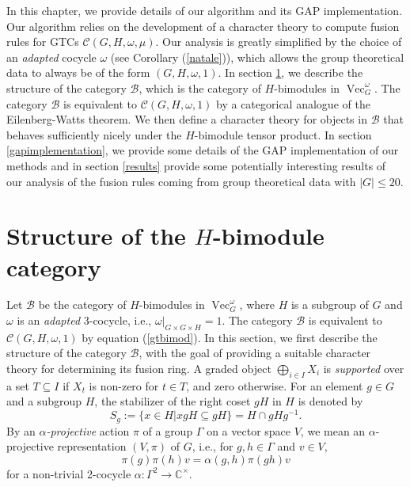 \documentclass[a4paper, 10pt]{book}
\theoremstyle{definition}
\numberwithin{equation}{chapter}
\newcommand\inv{^{-1}}
\newcommand\Vect{\operatorname{Vec}}
\newcommand\CC{\mathbb C}
\newcommand\C{\mathcal C}
\newcommand\B{\mathcal B}
\newcommand{\ra}\rightarrow
\begin{document}
In this chapter, we provide details of our algorithm and its GAP implementation. Our algorithm relies on the development of a character theory to compute fusion rules for GTCs $\C(G, H, \omega, \mu)$. Our analysis is greatly simplified by the choice of an \textit{adapted} cocycle  $\omega$ (see Corollary (\ref{natale})), which allows the group theoretical data to always be of the form $(G, H, \omega, 1)$.  In section \ref{structureHbimod}, we describe the structure of the category $\B$, which is the category of $H$-bimodules in $\Vect^\omega_G$. The category $\B$ is equivalent to $\C(G, H, \omega, 1)$ by a categorical analogue of the Eilenberg-Watts theorem. We then define a character theory for objects in $\B$ that behaves sufficiently nicely under the $H$-bimodule tensor product.  In section \ref{gapimplementation}, we provide some details of the GAP implementation of our methods and in section \ref{results} provide some potentially interesting results of our analysis of the fusion rules coming from group theoretical data with $|G|\leq 20$. 
\section{Structure of the $H$-bimodule category}\label{structureHbimod}
Let $\B $ be the category of $H$-bimodules in $\Vect^\omega_G$, where $H$ is a subgroup of $G$ and $\omega$ is an \textit{adapted} 3-cocycle, i.e., $\omega|_{G\times G\times H} = 1$. The category $\B$ is equivalent to $\C(G, H, \omega, 1)$ by equation (\ref{gtbimod}). In this section, we first describe the structure of the category $\B$, with the goal of providing a suitable character theory for determining its fusion ring. A graded object $\bigoplus_{i\in I} X_i$ is \textit{supported} over a set $T\subseteq I$ if $X_t$ is non-zero for $t\in T$, and zero otherwise. For an element $g\in G$ and a subgroup $H$, the stabilizer of the right coset $gH$ in $H$ is denoted by \begin{equation*}
	S_g := \{x\in H | xgH \subseteq gH\} = H\cap gHg\inv.
\end{equation*}
By an \textit{$\alpha$-projective} action $\pi$ of a group $\Gamma$ on a vector space $V$, we mean an $\alpha$-projective representation $(V, \pi)$ of $G$, i.e., for $g, h\in \Gamma$ and $v \in V$, \begin{equation*}
	\pi(g)\pi(h)v = \alpha(g, h)\pi(gh)v
	\end{equation*} for a non-trivial 2-cocycle $\alpha:\Gamma^2 \ra \CC^\times$.
\end{document}
